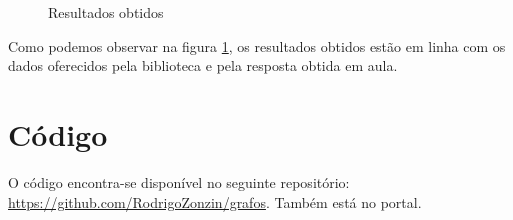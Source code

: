 \begin{figure}[h!]
	\centering
	
	
	\caption{Resultados obtidos}
	\label{fig:resultado}
\end{figure}

Como podemos observar na figura \ref{fig:resultado}, os resultados obtidos estão em linha com os dados oferecidos pela biblioteca e pela resposta obtida em aula. 


\newpage


\section{Código}
O código encontra-se disponível no seguinte repositório: 
\href{https://github.com/RodrigoZonzin/grafos}{https://github.com/RodrigoZonzin/grafos}. Também está no portal.